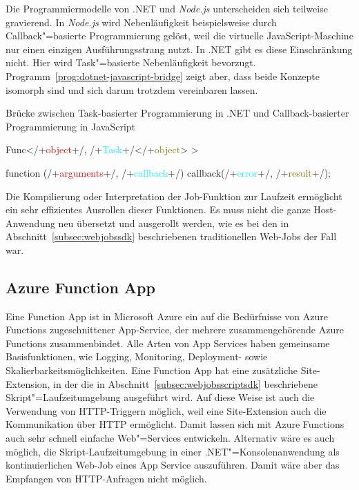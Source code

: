 Die Programmiermodelle von .NET und \textit{Node.js} unterscheiden sich teilweise gravierend. In \textit{Node.js} wird Nebenläufigkeit beispielsweise durch Callback"=basierte Programmierung gelöst, weil die virtuelle JavaScript-Maschine nur einen einzigen Ausführungsstrang nutzt. In .NET gibt es diese Einschränkung nicht. Hier wird Task"=basierte Nebenläufigkeit bevorzugt. Programm~\ref{prog:dotnet-javascript-bridge} zeigt aber, dass beide Konzepte isomorph sind und sich darum trotzdem vereinbaren lassen.

\begin{program}[!hbt]
\caption{Brücke zwischen Task-basierter Programmierung in .NET und Callback-basierter Programmierung in JavaScript}
\label{prog:dotnet-javascript-bridge}
\noindent\begin{minipage}[t]{.48\textwidth}
\lstset{showlines=true}
\begin{GenericCode}
Func</+\textcolor{red}{object}+/, /+\textcolor{cyan}{Task}+/</+\textcolor{olive}{object}> >


\end{GenericCode} %

\end{minipage}\hfill
\begin{minipage}[t]{.48\textwidth}
\lstset{showlines=true}
\begin{GenericCode}
function (/+\textcolor{red}{arguments}+/, /+\textcolor{cyan}{callback}+/) {
  callback(/+\textcolor{cyan}{error}+/, /+\textcolor{olive}{result}+/);
}
\end{GenericCode}

\end{minipage}
\end{program}

Die Kompilierung oder Interpretation der Job-Funktion zur Laufzeit ermöglicht ein sehr effizientes Ausrollen dieser Funktionen. Es muss nicht die ganze Host-Anwendung neu übersetzt und ausgerollt werden, wie es bei den in Abschnitt~\ref{subsec:webjobssdk} beschriebenen traditionellen Web-Jobs der Fall war.

\subsection{Azure Function App}

Eine Function App ist in Microsoft Azure ein auf die Bedürfnisse von Azure Functions zugeschnittener App-Service, der mehrere zusammengehörende Azure Functions zusammenbindet. Alle Arten von App Services haben gemeinsame Basisfunktionen, wie \zB Logging, Monitoring, Deployment- sowie Skalierbarkeitsmöglichkeiten. Eine Function App hat eine zusätzliche Site-Extension, in der die in Abschnitt~\ref{subsec:webjobsscriptsdk} beschriebene Skript"=Laufzeitumgebung ausgeführt wird. Auf diese Weise ist auch die Verwendung von HTTP-Triggern möglich, weil eine Site-Extension auch die Kommunikation über HTTP ermöglicht. Damit lassen sich mit Azure Functions auch sehr schnell einfache Web"=Services entwickeln. Alternativ wäre es auch möglich, die Skript-Laufzeitumgebung in einer .NET"=Konsolenanwendung als kontinuierlichen Web-Job eines App Service auszuführen. Damit wäre aber das Empfangen von HTTP-Anfragen nicht möglich.

